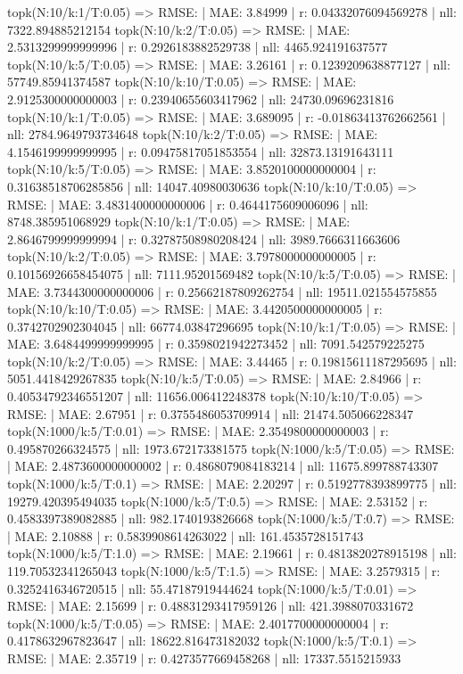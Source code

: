 topk(N:10/k:1/T:0.05) => RMSE: | MAE: 3.84999 | r: 0.04332076094569278 | nll: 7322.894885212154
topk(N:10/k:2/T:0.05) => RMSE: | MAE: 2.5313299999999996 | r: 0.2926183882529738 | nll: 4465.924191637577
topk(N:10/k:5/T:0.05) => RMSE: | MAE: 3.26161 | r: 0.1239209638877127 | nll: 57749.85941374587
topk(N:10/k:10/T:0.05) => RMSE: | MAE: 2.9125300000000003 | r: 0.23940655603417962 | nll: 24730.09696231816
topk(N:10/k:1/T:0.05) => RMSE: | MAE: 3.689095 | r: -0.01863413762662561 | nll: 2784.9649793734648
topk(N:10/k:2/T:0.05) => RMSE: | MAE: 4.1546199999999995 | r: 0.09475817051853554 | nll: 32873.13191643111
topk(N:10/k:5/T:0.05) => RMSE: | MAE: 3.8520100000000004 | r: 0.31638518706285856 | nll: 14047.40980030636
topk(N:10/k:10/T:0.05) => RMSE: | MAE: 3.4831400000000006 | r: 0.4644175609006096 | nll: 8748.385951068929
topk(N:10/k:1/T:0.05) => RMSE: | MAE: 2.8646799999999994 | r: 0.32787508980208424 | nll: 3989.7666311663606
topk(N:10/k:2/T:0.05) => RMSE: | MAE: 3.7978000000000005 | r: 0.10156926658454075 | nll: 7111.95201569482
topk(N:10/k:5/T:0.05) => RMSE: | MAE: 3.7344300000000006 | r: 0.25662187809262754 | nll: 19511.021554575855
topk(N:10/k:10/T:0.05) => RMSE: | MAE: 3.4420500000000005 | r: 0.3742702902304045 | nll: 66774.03847296695
topk(N:10/k:1/T:0.05) => RMSE: | MAE: 3.6484499999999995 | r: 0.3598021942273452 | nll: 7091.542579225275
topk(N:10/k:2/T:0.05) => RMSE: | MAE: 3.44465 | r: 0.19815611187295695 | nll: 5051.4418429267835
topk(N:10/k:5/T:0.05) => RMSE: | MAE: 2.84966 | r: 0.40534792346551207 | nll: 11656.006412248378
topk(N:10/k:10/T:0.05) => RMSE: | MAE: 2.67951 | r: 0.3755486053709914 | nll: 21474.505066228347
topk(N:1000/k:5/T:0.01) => RMSE: | MAE: 2.3549800000000003 | r: 0.495870266324575 | nll: 1973.672173381575
topk(N:1000/k:5/T:0.05) => RMSE: | MAE: 2.4873600000000002 | r: 0.4868079084183214 | nll: 11675.899788743307
topk(N:1000/k:5/T:0.1) => RMSE: | MAE: 2.20297 | r: 0.5192778393899775 | nll: 19279.420395494035
topk(N:1000/k:5/T:0.5) => RMSE: | MAE: 2.53152 | r: 0.4583397389082885 | nll: 982.1740193826668
topk(N:1000/k:5/T:0.7) => RMSE: | MAE: 2.10888 | r: 0.5839908614263022 | nll: 161.4535728151743
topk(N:1000/k:5/T:1.0) => RMSE: | MAE: 2.19661 | r: 0.4813820278915198 | nll: 119.70532341265043
topk(N:1000/k:5/T:1.5) => RMSE: | MAE: 3.2579315 | r: 0.3252416346720515 | nll: 55.47187919444624
topk(N:1000/k:5/T:0.01) => RMSE: | MAE: 2.15699 | r: 0.48831293417959126 | nll: 421.3988070331672
topk(N:1000/k:5/T:0.05) => RMSE: | MAE: 2.4017700000000004 | r: 0.4178632967823647 | nll: 18622.816473182032
topk(N:1000/k:5/T:0.1) => RMSE: | MAE: 2.35719 | r: 0.4273577669458268 | nll: 17337.5515215933
